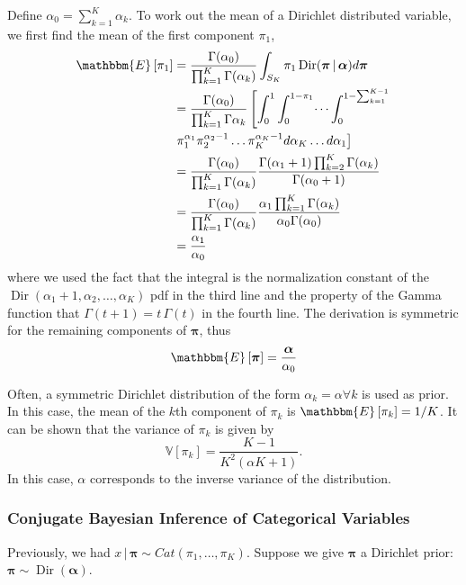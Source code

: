 \documentclass[final,3p,times,twocolumn]{elsarticle}
\DeclareMathOperator*{\Dir}{Dir}
\let\bs\boldsymbol
\begin{document}
Define $\alpha_0 = \sum_{k=1}^K \alpha_k$. To work out the mean of a Dirichlet distributed variable, we first find the mean of the first component $\pi_1$,
\begin{equation}
\label{eqn:dirmean1}
\begin{split}
\mathbbm{E}\left[\pi_1\right] &= \frac{\Gamma(\alpha_0)}{\prod_{k=1}^K\Gamma(\alpha_k)} \int\nolimits_{S_K} \pi_1 \Dir(\bs \pi \,|\, \bs \alpha)d\bs\pi \\
&= \frac{\Gamma(\alpha_0)}{\prod_{k=1}^K\Gamma{\alpha_k}} \left[\int_0^1\int_0^{1-\pi_1}\dots\int_0^{1-\sum_{k=1}^{K-1}} \right.\\
& \left.\pi_1^{\alpha_1}\pi_2^{\alpha_2-1}\dots\pi_K^{\alpha_K-1}d\alpha_K \dots d\alpha_1\right]\\
&= \frac{\Gamma(\alpha_0)}{\prod_{k=1}^K\Gamma(\alpha_k)} \frac{\Gamma(\alpha_1+1)\prod_{k=2}^K\Gamma(\alpha_k)}{\Gamma(\alpha_0+1)}\\
&= \frac{\Gamma(\alpha_0)}{\prod_{k=1}^K\Gamma(\alpha_k)} \frac{\alpha_1\prod_{k=1}^K\Gamma(\alpha_k)}{\alpha_0 \Gamma(\alpha_0)}\\
&= \frac{\alpha_1}{\alpha_0}
\end{split}
\end{equation}
where we used the fact that the integral is the normalization constant of the $\Dir(\alpha_1+1,\alpha_2,\dots,\alpha_K)$ pdf in the third line and the property of the Gamma function that $\Gamma(t+1)=t\,\Gamma(t)$ in the fourth line. 
The derivation is symmetric for the remaining components of $\bs \pi$, thus 
\begin{equation}
\label{eqn:dirmean}
\mathbbm{E}\left[\bs \pi \right] = \frac{\bs \alpha}{\alpha_0}
\end{equation}

Often, a symmetric Dirichlet distribution of the form $\alpha_k = \alpha \forall k$ is used as prior.
In this case, the mean of the $k$th component of $\pi_k$ is $\mathbbm{E}\left[\pi_k\right] = 1/K$.
It can be shown that the variance of $\pi_k$ is given by
\begin{equation}
\label{eqn:dirvar}
\mathbb{V}\left[\pi_k\right] = \frac{K-1}{K^2(\alpha K + 1)}.
\end{equation}
In this case, $\alpha$ corresponds to the inverse variance of the distribution.

\subsubsection*{\normalfont \small \bfseries Conjugate Bayesian Inference of Categorical Variables}
Previously, we had $x\,|\,\bs \pi \sim Cat(\pi_1,\dots,\pi_K)$.
Suppose we give $\bs \pi$ a Dirichlet prior: $\bs \pi \sim \Dir(\bs \alpha)$.
\end{document}
